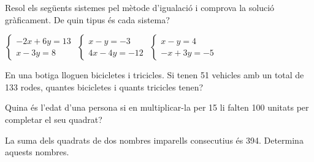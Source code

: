 \begin{activitats}
\begin{mylist}

\exer  Resol els següents sistemes pel mètode d'igualació i comprova la solució gràficament. De quin tipus és cada sistema?

\begin{tasks}
	\task  $\left\{\begin{array}{c} {-2x+6y=13} \\ {x-3y=8} \end{array}\right. $   
	\task  $\left\{\begin{array}{c} {x-y=-3} \\ {4x-4y=-12} \end{array}\right. $   
	\task  $\left\{\begin{array}{c} {x-y=4} \\ {-x+3y=-5} \end{array}\right. $
\end{tasks}
\answers{[Incompatible, Compatible indeterminat,  Compatible determinat $x = 9/2$, $y = –1/2$]}

 
\exer  En una botiga lloguen bicicletes i tricicles. Si tenen 51 vehicles amb un total de 133 rodes, quantes bicicletes i quants tricicles tenen?

\exer  Quina és l'edat d'una persona si en multiplicar-la per 15 li falten 100 unitats per completar el seu quadrat?



\exer  La suma dels quadrats de dos nombres imparells consecutius és 394. Determina aquests nombres. 


\end{mylist}
\end{activitats}
